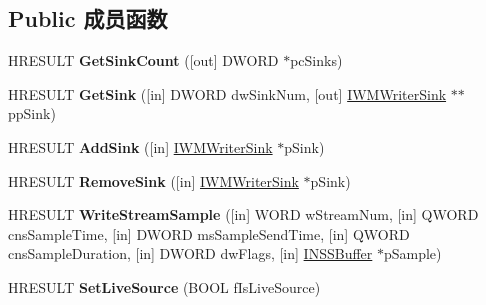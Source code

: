 \subsection*{Public 成员函数}
\begin{DoxyCompactItemize}
\item 
\mbox{\label{interface_i_w_m_writer_advanced_a9f126458dca80094d5600a97ec56d0d0}} 
H\+R\+E\+S\+U\+LT {\bfseries Get\+Sink\+Count} (\mbox{[}out\mbox{]} D\+W\+O\+RD $\ast$pc\+Sinks)
\item 
\mbox{\label{interface_i_w_m_writer_advanced_a9e1068abd8b07977ca4670a3a47298a4}} 
H\+R\+E\+S\+U\+LT {\bfseries Get\+Sink} (\mbox{[}in\mbox{]} D\+W\+O\+RD dw\+Sink\+Num, \mbox{[}out\mbox{]} \hyperlink{interface_i_w_m_writer_sink}{I\+W\+M\+Writer\+Sink} $\ast$$\ast$pp\+Sink)
\item 
\mbox{\label{interface_i_w_m_writer_advanced_a0c69b98177c1c5901ce8bbf476b563b0}} 
H\+R\+E\+S\+U\+LT {\bfseries Add\+Sink} (\mbox{[}in\mbox{]} \hyperlink{interface_i_w_m_writer_sink}{I\+W\+M\+Writer\+Sink} $\ast$p\+Sink)
\item 
\mbox{\label{interface_i_w_m_writer_advanced_a05b64c4cb541e2d91e7edf62121b55ef}} 
H\+R\+E\+S\+U\+LT {\bfseries Remove\+Sink} (\mbox{[}in\mbox{]} \hyperlink{interface_i_w_m_writer_sink}{I\+W\+M\+Writer\+Sink} $\ast$p\+Sink)
\item 
\mbox{\label{interface_i_w_m_writer_advanced_a9b34f458f208bb6142d5c0e2baa3a1e9}} 
H\+R\+E\+S\+U\+LT {\bfseries Write\+Stream\+Sample} (\mbox{[}in\mbox{]} W\+O\+RD w\+Stream\+Num, \mbox{[}in\mbox{]} Q\+W\+O\+RD cns\+Sample\+Time, \mbox{[}in\mbox{]} D\+W\+O\+RD ms\+Sample\+Send\+Time, \mbox{[}in\mbox{]} Q\+W\+O\+RD cns\+Sample\+Duration, \mbox{[}in\mbox{]} D\+W\+O\+RD dw\+Flags, \mbox{[}in\mbox{]} \hyperlink{interface_i_n_s_s_buffer}{I\+N\+S\+S\+Buffer} $\ast$p\+Sample)
\item 
\mbox{\label{interface_i_w_m_writer_advanced_a1a2c73041d96086a092055b6bd8c92a2}} 
H\+R\+E\+S\+U\+LT {\bfseries Set\+Live\+Source} (B\+O\+OL f\+Is\+Live\+Source)
\item 
\mbox{\label{interface_i_w_m_writer_advanced_a45ceb37850bb22ab3c13509fe03364a2}} 
$$
\end{DoxyCompactItemize}
